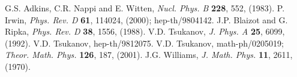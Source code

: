 \documentclass[a4paper,12pt]{article}
\begin{document}
\vspace{0,5 cm}
 \begin{thebibliography}{99}
 G.S. Adkins, C.R. Nappi and E. Witten, \textit{Nucl. Phys. B}
\textbf{228}, 552, (1983).
 P. Irwin, \textit{Phys. Rev. D} \textbf{61}, 114024,
(2000); hep-th/9804142.
 J.P. Blaizot and G. Ripka, \textit{Phys. Rev. D} \textbf{38},
1556, (1988).
 V.D. Tsukanov, \textit{J. Phys. A} \textbf{25}, 6099, (1992).
 V.D. Tsukanov, hep-th/9812075.
 V.D. Tsukanov, math-ph/0205019; \textit{Theor. Math. Phys.} \textbf{126},
187, (2001).
 J.G. Williams, \textit{J. Math. Phys.} \textbf{11}, 2611, (1970).


\end{thebibliography}
\end{document}
